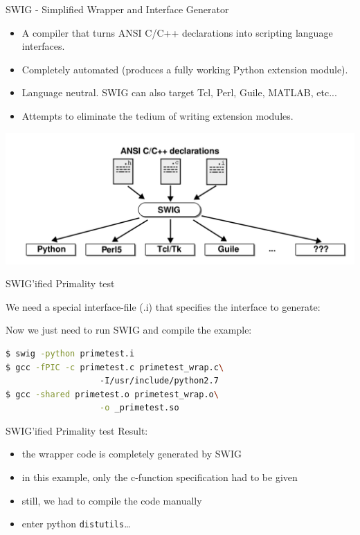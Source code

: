 \documentclass[german]{beamer}
\newcommand{\ra}{\text{$\rightarrow$}}
\begin{document}
\begin{frame}{SWIG - Simplified Wrapper and Interface
    Generator}

\begin{itemize}
\item A compiler that turns ANSI C/C++ declarations into scripting language interfaces.
\item Completely automated (produces a fully working Python extension module).
\item Language neutral. SWIG can also target Tcl, Perl, Guile, MATLAB, etc...
\item Attempts to eliminate the tedium of writing extension modules.
\end{itemize}

\centering
\includegraphics[width=\textwidth]{pics/swigstructure}
\end{frame}
\begin{frame}[fragile]{SWIG'ified Primality test}

  We need a special interface-file (.i) that specifies the interface
  to generate:
%  
  

\vfill
  Now we just need to run SWIG and compile the example:
  \begin{lstlisting}[language=bash]
$ swig -python primetest.i 
$ gcc -fPIC -c primetest.c primetest_wrap.c\ 
                   -I/usr/include/python2.7
$ gcc -shared primetest.o primetest_wrap.o\
                   -o _primetest.so
  \end{lstlisting}
\end{frame}

\begin{frame}{SWIG'ified Primality test}
  Result:
  \begin{itemize}
  \item the wrapper code is completely generated by SWIG
  \item in this example, only the c-function specification had to be
    given
  \item still, we had to compile the code manually
  \item[\ra] enter python {\tt distutils}\ldots
  \end{itemize}
\end{frame}
\end{document}
